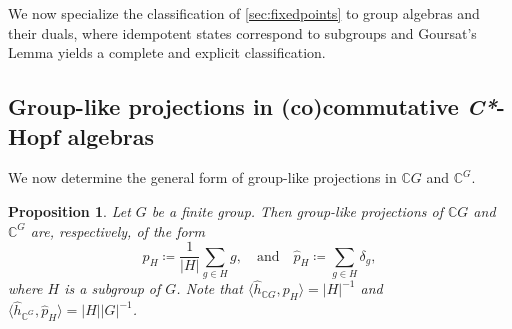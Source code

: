 \documentclass[a4paper,10pt]{amsart}
\newcommand{\eval}[2]{\langle #1 , #2\rangle}
\newtheorem{proposition}[theorem]{Proposition}
\theoremstyle{definition}
\begin{document}
We now specialize the classification of \cref{sec:fixedpoints} to group algebras and their duals, where idempotent states correspond to subgroups and Goursat's Lemma yields a complete and explicit classification.

\subsection{Group-like projections in (co)commutative {\itshape{}C*}-Hopf algebras}

We now determine the general form of group-like projections in $\mathbb{C}G$ and $\mathbb{C}^G$.

\begin{proposition}
\label{prop:grouplikeProjsInCG}
	Let $G$ be a finite group.
    Then group-like projections of $\mathbb{C}G$ and $\mathbb{C}^G$ are, respectively, of the form
	\[
		p_H \coloneqq
            \frac{1}{|H|} \sum_{g \in H} g
        ,\quad\text{and}\quad
        \hat{p}_H \coloneqq
            \sum_{g \in H} \delta_g,
	\]
	where $H$ is a subgroup of $G$.
    Note that
    $\eval{\hat{h}_{\mathbb{C}G}}{p_H} = |H|^{-1}$ and $\eval{\hat{h}_{\mathbb{C}^G}}{\hat{p}_H} = |H||G|^{-1}$.
\end{proposition}
\end{document}
